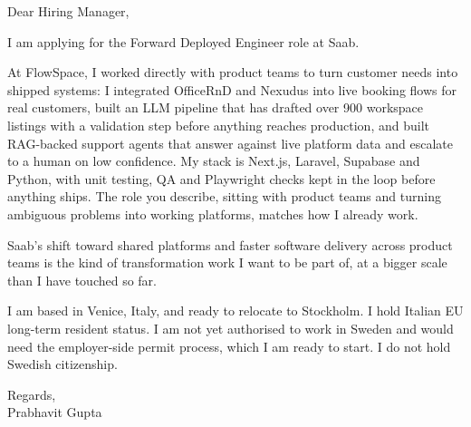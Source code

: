 \documentclass[a4paper,11pt]{article}
\begin{document}
Dear Hiring Manager,

I am applying for the Forward Deployed Engineer role at Saab.

At FlowSpace, I worked directly with product teams to turn customer needs into shipped systems: I integrated OfficeRnD and Nexudus into live booking flows for real customers, built an LLM pipeline that has drafted over 900 workspace listings with a validation step before anything reaches production, and built RAG-backed support agents that answer against live platform data and escalate to a human on low confidence. My stack is Next.js, Laravel, Supabase and Python, with unit testing, QA and Playwright checks kept in the loop before anything ships. The role you describe, sitting with product teams and turning ambiguous problems into working platforms, matches how I already work.

Saab's shift toward shared platforms and faster software delivery across product teams is the kind of transformation work I want to be part of, at a bigger scale than I have touched so far.

I am based in Venice, Italy, and ready to relocate to Stockholm. I hold Italian EU long-term resident status. I am not yet authorised to work in Sweden and would need the employer-side permit process, which I am ready to start. I do not hold Swedish citizenship.

Regards,\\
Prabhavit Gupta
\end{document}

